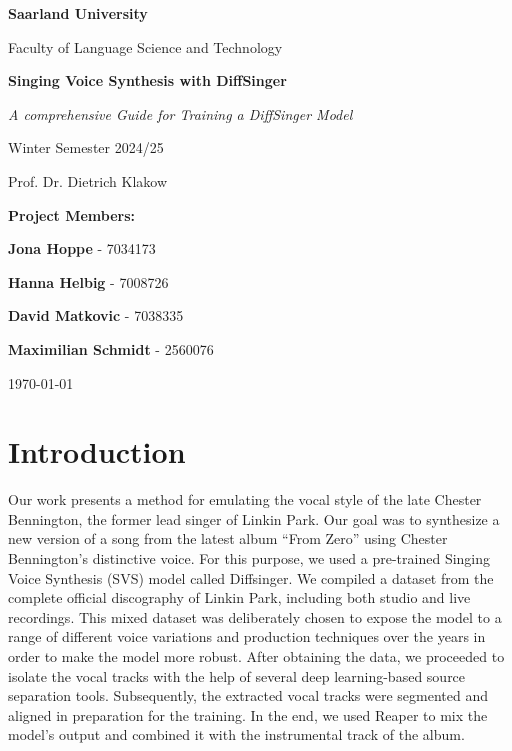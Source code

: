 \documentclass[a4paper]{article}
\subtitle \\
\newcommand{\StudNameTwo}{\textbf{Jona Hoppe} - 7034173}
\newcommand{\StudNameThree}{\textbf{Hanna Helbig} - 7008726}
\newcommand{\StudNameOne}{\textbf{David Matkovic} - 7038335 }
\newcommand{\StudNameFour}{\textbf{Maximilian Schmidt} - 2560076}
\begin{document}
\begin{titlepage}
    \centering
    \vspace*{1cm}

    {\LARGE\bfseries Saarland University \par}
    \vspace{0.5cm}
    {\Large Faculty of Language Science and Technology \par}
    \vfill

    {\Huge\bfseries Singing Voice Synthesis with DiffSinger\par}
    \vspace{0.25cm}
    {\large\textit{A comprehensive Guide for Training a DiffSinger Model}\par}
    \vspace{1cm}

    {\Large Winter Semester 2024/25 \par}
    \vspace{0.5cm}
    {\large Prof. Dr. Dietrich Klakow \par}
    \vfill

    {\Large\textbf{Project Members:}\par}
    \vspace{0.3cm}
    {\large\StudNameTwo\par}
    {\large\StudNameThree\par}
    {\large\StudNameOne\par}
    {\large\StudNameFour\par}

    \vfill
    {\large\today\par}
\end{titlepage}


	
	
	\tableofcontents
	\newpage
	
	\section{Introduction}
 
 	Our work presents a method for emulating the vocal style of the late Chester Bennington, the former lead singer of Linkin Park. Our goal was to synthesize a new version of a song from the latest album “From Zero” using Chester Bennington’s distinctive voice. For this purpose, we used a pre-trained Singing Voice Synthesis (SVS) model called Diffsinger.
We compiled a dataset from the complete official discography of Linkin Park, including both studio and live recordings. This mixed dataset was deliberately chosen to expose the model to a range of different voice variations and production techniques over the years in order to make the model more robust.
After obtaining the data, we proceeded to isolate the vocal tracks with the help of several deep learning-based source separation tools. Subsequently, the extracted vocal tracks were segmented and aligned in preparation for the training. In the end, we used Reaper to mix the model’s output and combined it with the instrumental track of the album.
\end{document}
